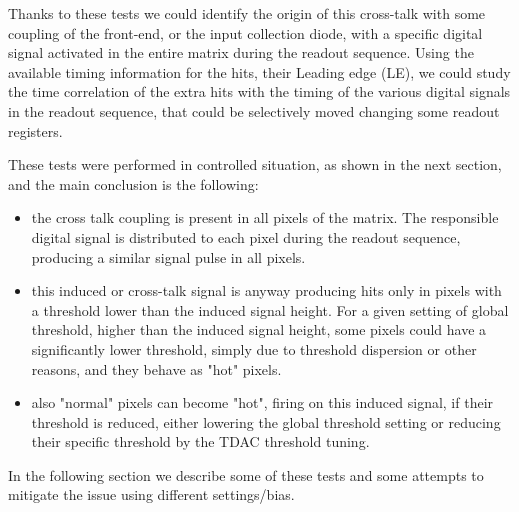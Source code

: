 Thanks to these tests we could identify the origin of this cross-talk with some coupling of the front-end,  or the input collection diode, with a specific digital signal activated in the entire matrix during the readout sequence.
Using the available timing information for the hits, their Leading edge (LE),  we could study the time correlation of the extra hits with the timing of the various digital signals in the readout sequence, that could be selectively moved changing some readout registers. 

These tests were performed in controlled situation, as shown in the next section,  and the main conclusion is the following:

\begin{itemize}
\item the cross talk coupling is present in all pixels of the matrix. The responsible digital signal is distributed to each pixel during the readout sequence, producing a similar signal pulse in all pixels.
\item this induced or cross-talk signal is anyway producing hits only in pixels with a threshold lower than the induced signal height. For a given setting of global threshold, higher than the induced signal height, some pixels could have a significantly lower threshold,  simply due to threshold dispersion or other reasons, and they behave as "hot" pixels.  
\item also "normal" pixels can become "hot", firing on this induced signal, if their threshold is reduced, either lowering the global threshold setting or reducing their specific threshold by the TDAC threshold tuning.
\end{itemize}


In the following section we describe some of these tests and some attempts to mitigate the issue using different settings/bias.





